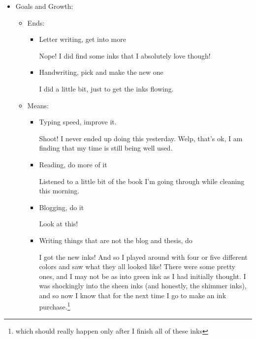 \documentclass[12pt]{article}
\renewcommand{\,}{\textsuperscript{,}}
\begin{document}
\begin{itemize}
\begin{itemize}
\begin{itemize}
\item Eat more than 2 meals a day

Oof I ate so little yesterday. Today's goal is to actually consume the oats that are sitting next to me, the lunch that I packed\footnote{leftover curry rice}, and then something for dinner.

\end{itemize}

\end{itemize}

\item Goals and Growth:

\begin{itemize}

\item Ends:

\begin{itemize}

\item Letter writing, get into more

Nope! I did find some inks that I absolutely love though!

\item Handwriting, pick and make the new one

I did a little bit, just to get the inks flowing.

\end{itemize}

\item Means:

\begin{itemize}

\item Typing speed, improve it.

Shoot! I never ended up doing this yesterday.  
Welp, that's ok, I am finding that my time is still being well used.

\item Reading, do more of it

Listened to a little bit of the book I'm going through while cleaning this morning.

\item Blogging, do it

Look at this!

\item Writing things that are not the blog and thesis, do

I got the new inks! And so I played around with four or five different colors and saw what they all looked like! There were some pretty ones, and I may not be as into green ink as I had initially thought. I was shockingly into the sheen inks (and honestly, the shimmer inks), and so now I know that for the next time I go to make an ink purchase.\footnote{which should really happen only after I finish all of these inks}
\end{itemize}

\end{itemize}

\end{itemize}
\end{document}
